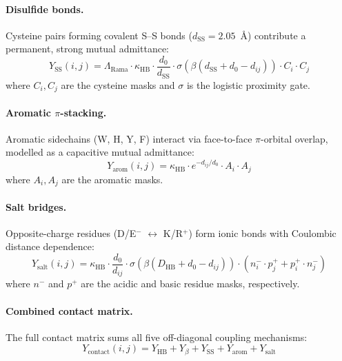 \paragraph{Disulfide bonds.}
Cysteine pairs forming covalent S--S bonds ($d_\text{SS} = 2.05$~\AA)
contribute a permanent, strong mutual admittance:
\begin{equation}
    Y_\text{SS}(i,j) = \Lambda_\text{Rama} \cdot \kappa_\text{HB}
    \cdot \frac{d_0}{d_\text{SS}} \cdot
    \sigma\!\left(\beta(d_\text{SS} + d_0 - d_{ij})\right)
    \cdot C_i \cdot C_j
    \label{eq:disulfide}
\end{equation}
where $C_i, C_j$ are the cysteine masks and
$\sigma$ is the logistic proximity gate.

\paragraph{Aromatic $\pi$-stacking.}
Aromatic sidechains (W, H, Y, F) interact via face-to-face
$\pi$-orbital overlap, modelled as a capacitive mutual admittance:
\begin{equation}
    Y_\text{arom}(i,j) = \kappa_\text{HB}
    \cdot e^{-d_{ij}/d_0} \cdot A_i \cdot A_j
    \label{eq:aromatic}
\end{equation}
where $A_i, A_j$ are the aromatic masks.

\paragraph{Salt bridges.}
Opposite-charge residues (D/E$^-$ $\leftrightarrow$ K/R$^+$) form
ionic bonds with Coulombic distance dependence:
\begin{equation}
    Y_\text{salt}(i,j) = \kappa_\text{HB}
    \cdot \frac{d_0}{d_{ij}}
    \cdot \sigma\!\left(\beta(D_\text{HB} + d_0 - d_{ij})\right)
    \cdot (n_i^- \cdot p_j^+ + p_i^+ \cdot n_j^-)
    \label{eq:salt_bridge}
\end{equation}
where $n^-$ and $p^+$ are the acidic and basic residue masks,
respectively.

\paragraph{Combined contact matrix.}
The full contact matrix sums all five off-diagonal coupling
mechanisms:
\begin{equation}
    Y_\text{contact}(i,j) =
    Y_\text{HB} + Y_\beta + Y_\text{SS} + Y_\text{arom} + Y_\text{salt}
    \label{eq:contact_total}
\end{equation}

